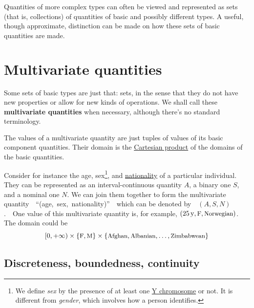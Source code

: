 \documentclass[
  a4paper,
  DIV=11,
  numbers=noendperiod,
  oneside]{scrreprt}
\begin{document}
\providecommand*{\mo}[1][=]{\mathord{\,#1\,}}
\providecommand*{\yX}{\se{X}}
\providecommand*{\yY}{\se{Y}}
\providecommand*{\yI}{\se{I}}
\providecommand{\di}{\mathrm{d}}

Quantities of more complex types can often be viewed and represented as
sets (that is, collections) of quantities of basic and possibly
different types. A useful, though approximate, distinction can be made
on how these sets of basic quantities are made.

\hypertarget{sec-data-multiv}{%
\section{Multivariate quantities}\label{sec-data-multiv}}

Some sets of basic types are just that: sets, in the sense that they do
not have new properties or allow for new kinds of operations. We shall
call these {\textbf{multivariate quantities}} when necessary, although
there's no standard terminology.

The values of a multivariate quantity are just tuples of values of its
basic component quantities. Their domain is the
\href{https://mathworld.wolfram.com/CartesianProduct.html}{Cartesian
product} of the domains of the basic quantities.

Consider for instance the age, sex\footnote{We define \emph{sex} by the
  presence of at least one
  \href{https://www.genome.gov/about-genomics/fact-sheets/Y-Chromosome-facts}{Y
  chromosome} or not. It is different from \emph{gender}, which involves
  how a person identifies.}, and
\href{https://www.gov.uk/government/publications/nationalities/list-of-nationalities}{nationality}
of a particular individual. They can be represented as an
interval-continuous quantity \(A\), a binary one \(S\), and a nominal
one \(N\). We can join them together to form the multivariate
quantity~~``(age,~sex,~nationality)''~~which can be denoted
by~~{\((A,S,N)\).}~~One value of this multivariate quantity is, for
example,
{\((25\,\mathrm{y}, \text{\small F}, \text{\small Norwegian})\).} The
domain could be \[
[0,+\infty)\times
\{\text{\small F}, \text{\small M}\} \times
\{\text{\small Afghan}, \text{\small Albanian}, \dotsc, \text{\small Zimbabwean}\}
\]

\hypertarget{discreteness-boundedness-continuity}{%
\subsection{Discreteness, boundedness,
continuity}\label{discreteness-boundedness-continuity}}
\end{document}
